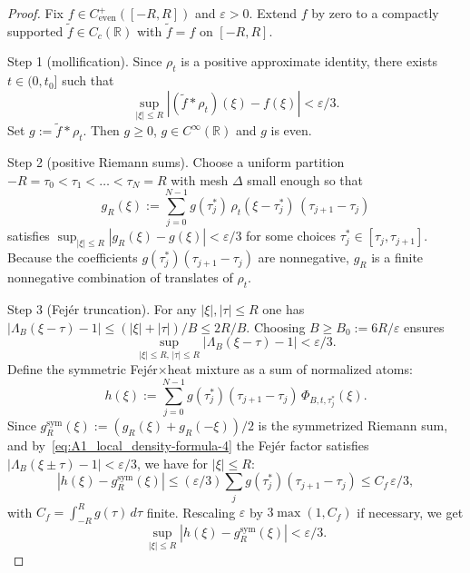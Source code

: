\begin{proof}
Fix $f\in C^+_{\mathrm{even}}([-R,R])$ and $\varepsilon>0$. Extend $f$ by zero to a compactly supported $\widetilde f\in C_c(\mathbb R)$ with $\widetilde f=f$ on $[-R,R]$.

Step 1 (mollification). Since $\rho_t$ is a positive approximate identity, there exists $t\in(0,t_0]$ such that
\begin{equation}\label{eq:A1_local_density-formula-6}
\sup_{|\xi|\le R} |(\widetilde f*\rho_t)(\xi)-f(\xi)| < \varepsilon/3.
\end{equation}
Set $g:=\widetilde f*\rho_t$. Then $g\ge0$, $g\in C^{\infty}(\mathbb R)$ and $g$ is even.

Step 2 (positive Riemann sums). Choose a uniform partition $-R=\tau_0<\tau_1<\dots<\tau_N=R$ with mesh $\Delta$ small enough so that
\begin{equation}\label{eq:A1_local_density-formula-5}
g_R(\xi):=\sum_{j=0}^{N-1} g(\tau_j^*)\,\rho_t(\xi-\tau_j^*)\,(\tau_{j+1}-\tau_j)
\end{equation}
satisfies $\sup_{|\xi|\le R} |g_R(\xi)-g(\xi)|<\varepsilon/3$ for some choices $\tau_j^*\in[\tau_j,\tau_{j+1}]$. Because the coefficients $g(\tau_j^*)(\tau_{j+1}-\tau_j)$ are nonnegative, $g_R$ is a finite nonnegative combination of translates of $\rho_t$.

Step 3 (Fej\'er truncation). For any $|\xi|,|\tau|\le R$ one has $|\Lambda_B(\xi-\tau)-1|\le (|\xi|+|\tau|)/B\le 2R/B$. Choosing $B\ge B_0:=6R/\varepsilon$ ensures
\begin{equation}\label{eq:A1_local_density-formula-4}
\sup_{|\xi|\le R,\,|\tau|\le R} |\Lambda_B(\xi-\tau)-1| < \varepsilon/3.
\end{equation}
Define the symmetric Fej\'er$\times$heat mixture as a sum of normalized atoms:
\begin{equation}\label{eq:A1_local_density-formula-3}
h(\xi):=\sum_{j=0}^{N-1} g(\tau_j^*) (\tau_{j+1}-\tau_j)\,\Phi_{B,t,\tau_j^*}(\xi).
\end{equation}
Since $g_R^{\mathrm{sym}}(\xi):=(g_R(\xi)+g_R(-\xi))/2$ is the symmetrized Riemann sum, and by~\eqref{eq:A1_local_density-formula-4} the Fej\'er factor satisfies $|\Lambda_B(\xi\pm\tau)-1|<\varepsilon/3$, we have for $|\xi|\le R$:
\begin{equation}\label{eq:A1_local_density-formula-2}
|h(\xi) - g_R^{\mathrm{sym}}(\xi)| \le (\varepsilon/3) \sum_j g(\tau_j^*)(\tau_{j+1}-\tau_j) \le C_f\,\varepsilon/3,
\end{equation}
with $C_f=\int_{-R}^{R} g(\tau)\,d\tau$ finite. Rescaling $\varepsilon$ by $3\max(1,C_f)$ if necessary, we get
\begin{equation}\label{eq:A1_local_density-formula-1}
\sup_{|\xi|\le R} |h(\xi) - g_R^{\mathrm{sym}}(\xi)| < \varepsilon/3.
\end{equation}


\end{proof}
